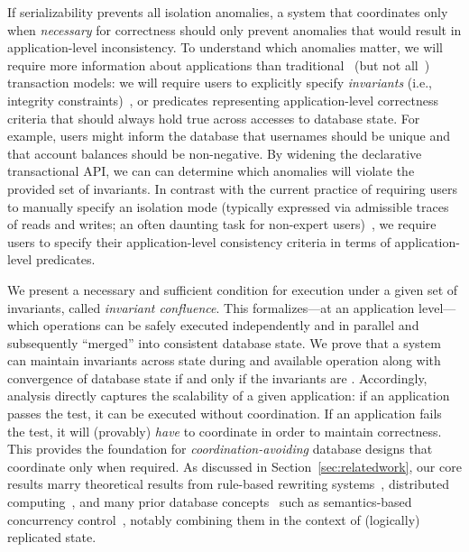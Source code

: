 
If serializability prevents all isolation anomalies, a system that
coordinates only when \textit{necessary} for correctness should only
prevent anomalies that would result in application-level
inconsistency. To understand which anomalies matter, we will require
more information about applications than
traditional~\cite{bernstein-book,gray-virtues} (but not
all~\cite{eswaran-consistency,korth-serializability,decomp-semantics,garciamolina-semantics,activedb-book,ic-survey,ic-survey-two})
transaction models: we will require users to explicitly specify
\textit{invariants} (i.e., integrity constraints)~\cite{traiger-tods},
or predicates representing application-level correctness criteria that
should always hold true across accesses to database state. For
example, users might inform the database that usernames should be
unique and that account balances should be non-negative. By widening
the declarative transactional API, we can can determine which
anomalies will violate the provided set of invariants. In contrast
with the current practice of requiring users to manually specify an
isolation mode (typically expressed via admissible traces of reads and
writes; an often daunting task for non-expert
users)~\cite{consistency-borders}, we require users to specify their
application-level consistency criteria in terms of application-level
predicates.

We present a necessary and sufficient condition for \cfree execution
under a given set of invariants, called \textit{invariant
  confluence}. This \iconfluence formalizes---at an application
level---which operations can be safely executed independently and in
parallel and subsequently ``merged'' into consistent database
state. We prove that a system can maintain invariants across state
during \cfree and available operation along with convergence of
database state if and only if the invariants are
\iconfluent. Accordingly, \iconfluence analysis directly captures the
scalability of a given application: if an application passes the test,
it can be executed without coordination. If an application fails the
\iconfluence test, it will (provably) \textit{have} to coordinate in
order to maintain correctness. This provides the foundation for
\textit{coordination-avoiding} database designs that coordinate only
when required. As discussed in Section~\ref{sec:relatedwork}, our core
results marry theoretical results from rule-based rewriting
systems~\cite{obs-confluence,termrewriting}, distributed
computing~\cite{herlihy-apologizing,gilbert-cap,hat-vldb}, and many
prior database concepts~\cite{activedb-book,ic-survey,ic-survey-two}
such as semantics-based concurrency
control~\cite{sdd1,decomp-semantics,badrinath-semantics,garciamolina-semantics,korth-serializability,atomictransactions,weihl-thesis},
notably combining them in the context of (logically) replicated state.

